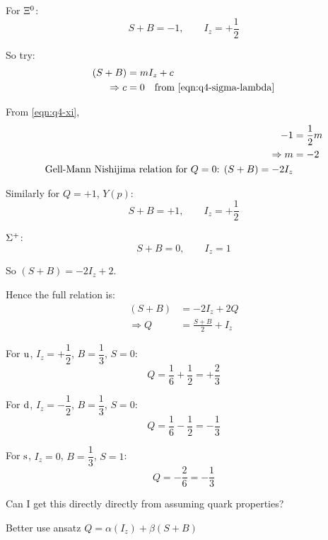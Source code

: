\begin{parts}
	For $\Xi^{0}$:
	\begin{equation}
		S+B=-1, \qquad I_z=+\frac{1}{2}
		\label{eqn:q4-xi}
	\end{equation}
	
	So try:
	\begin{align*}
		(S+B) &= mI_z + c \\
		\Rightarrow c &= 0 \textnormal{\hspace{1em}from \eqref{eqn:q4-sigma-lambda}}
	\end{align*}
	
	From \eqref{eqn:q4-xi},
	\begin{align*}
		-1 &= \frac{1}{2}m \\
		\Rightarrow m &= -2 \\
		\textnormal{Gell-Mann Nishijima relation for $Q=0$: } (S+B) = -2I_z
	\end{align*}
	
	Similarly for $Q=+1$, $Y(p)$:
	\begin{equation*}
		S+B=+1, \qquad I_z=+\frac{1}{2}
	\end{equation*}
	
	$\Sigma^{+}$:
	\begin{equation*}
		S+B=0, \qquad I_z=1
	\end{equation*}
	
	So $(S+B) = -2I_z + 2$.
	
	Hence the full relation is:
	\begin{align*}
		(S+B) &= -2I_z + 2Q \\
		\Rightarrow Q &= \frac{S+B}{2} + I_z
	\end{align*}
	
	For $\mathrm{u}$, $I_z=+\dfrac{1}{2}$, $B=\dfrac{1}{3}$, $S=0$:
	\begin{equation*}
		Q = \frac{1}{6}+ \frac{1}{2} = +\frac{2}{3}
	\end{equation*}
	
	For $\mathrm{d}$, $I_z=-\dfrac{1}{2}$, $B=\dfrac{1}{3}$, $S=0$:
	\begin{equation*}
		Q = \frac{1}{6} - \frac{1}{2} = -\frac{1}{3}
	\end{equation*}
	
	For $\mathrm{s}$, $I_z=0$, $B=\dfrac{1}{3}$, $S=1$:
	\begin{equation*}
		Q = -\frac{2}{6} = -\frac{1}{3}
	\end{equation*}
	
	{
		\color{red}Can I get this directly directly from assuming quark properties?
		
		Better use ansatz $Q=\alpha(I_z) + \beta(S+B)$
		
}
\end{parts}
